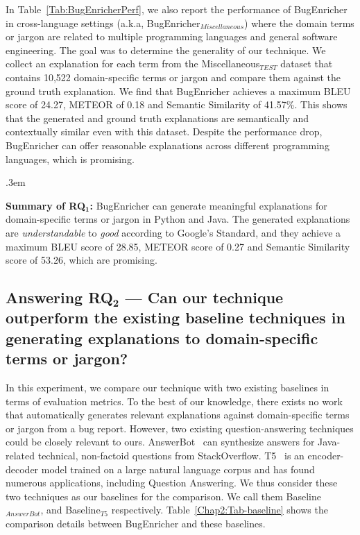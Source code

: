 In Table~\ref{Tab:BugEnricherPerf}, we also report the performance of BugEnricher in cross-language settings (a.k.a, BugEnricher$_{Miscellaneous}$) where the domain terms or jargon are related to multiple programming languages and general software engineering. The goal was to determine the generality of our technique. We collect an explanation for each term from the Miscellaneous$_{TEST}$ dataset that contains 10,522 domain-specific terms or jargon and compare them against the ground truth explanation. We find that BugEnricher achieves a maximum \acrshort{BLEU} score of 24.27, \acrshort{METEOR} of 0.18 and \acrfull{Semantic Similarity} of 41.57\%. This shows that the generated and ground truth explanations are semantically and contextually similar even with this dataset. Despite the performance drop, BugEnricher can offer reasonable explanations across different programming languages, which is promising.\par

\FrameSep.3em
\begin{frshaded}
	\noindent
	\textbf{Summary of RQ$\mathbf{_1}$:} BugEnricher can generate meaningful explanations for domain-specific terms or jargon in Python and Java. The generated explanations are \textit{understandable} to \textit{good} according to Google's Standard, and they achieve a maximum BLEU score of 28.85, METEOR score of 0.27 and Semantic Similarity score of 53.26, which are promising.
\end{frshaded}


\subsection{Answering RQ$\mathbf{_2}$ --- Can our technique outperform the existing baseline techniques in generating explanations to domain-specific terms or jargon?}\label{Chap2:RQ2}

In this experiment, we compare our technique with two existing baselines in terms of evaluation metrics. To the best of our knowledge, there exists no work that automatically generates relevant explanations against domain-specific terms or jargon from a bug report. However, two existing question-answering techniques could be closely relevant to ours. AnswerBot~\cite{xu2017answerbot} can synthesize answers for Java-related technical, non-factoid questions from StackOverflow. T5~\cite{raffel2020exploring} is an encoder-decoder model trained on a large natural language corpus and has found numerous applications, including Question Answering. We thus consider these two techniques as our baselines for the comparison. We call them Baseline$_{AnswerBot}$, and Baseline$_{T5}$ respectively. Table~\ref{Chap2:Tab-baseline} shows the comparison details between BugEnricher and these baselines.\par


